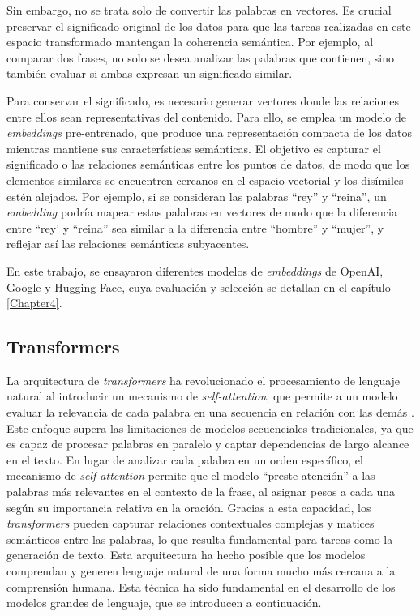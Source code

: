 Sin embargo, no se trata solo de convertir las palabras en vectores. Es crucial preservar el significado original 
de los datos para que las tareas realizadas en este espacio transformado mantengan la coherencia semántica. 
Por ejemplo, al comparar dos frases, no solo se desea analizar las palabras que contienen, sino también evaluar 
si ambas expresan un significado similar.

Para conservar el significado, es necesario generar vectores donde las relaciones entre ellos sean representativas 
del contenido. Para ello, se emplea un modelo de \textit{embeddings} pre-entrenado, que produce una representación compacta 
de los datos mientras mantiene sus características semánticas. El objetivo es capturar el significado o las relaciones 
semánticas entre los puntos de datos, de modo que los elementos similares se encuentren cercanos en el espacio vectorial y los disímiles estén alejados. 
Por ejemplo, si se consideran las palabras ``rey'' y ``reina'', un \textit{embedding} podría mapear estas palabras en vectores de modo 
que la diferencia entre ``rey' y ``reina'' sea similar a la diferencia entre ``hombre'' y ``mujer'', y reflejar así las 
relaciones semánticas subyacentes.

En este trabajo, se ensayaron diferentes modelos de \textit{embeddings} de OpenAI, Google y Hugging Face, 
cuya evaluación y selección se detallan en el capítulo \ref{Chapter4}.

\subsection{Transformers}

La arquitectura de \textit{transformers} ha revolucionado el procesamiento de lenguaje natural al introducir un mecanismo de \textit{self-attention}, 
que permite a un modelo evaluar la relevancia de cada palabra en una secuencia en relación con las demás \citep{paper:transformers}. Este enfoque 
supera las limitaciones de modelos secuenciales tradicionales, ya que es capaz de procesar palabras en paralelo y captar dependencias de largo alcance 
en el texto. En lugar de analizar cada palabra en un orden específico, el mecanismo de \textit{self-attention} permite que el modelo ``preste atención'' 
a las palabras más relevantes en el contexto de la frase, al asignar pesos a cada una según su importancia relativa en la oración. Gracias a esta capacidad, 
los \textit{transformers} pueden capturar relaciones contextuales complejas y matices semánticos entre las palabras, 
lo que resulta fundamental para tareas como la generación de texto. Esta arquitectura ha hecho posible que los modelos comprendan y generen 
lenguaje natural de una forma mucho más cercana a la comprensión humana. Esta técnica 
ha sido fundamental en el desarrollo de los modelos grandes de lenguaje, que se introducen a continuación.

